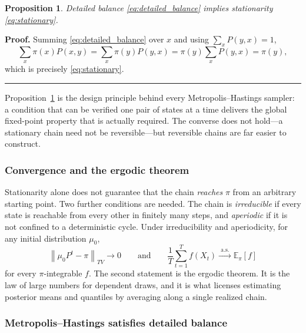 \documentclass[11pt]{article}
\newtheorem{proposition}{Proposition}
\newenvironment{proof}[1][Proof]{\noindent\textbf{#1.} }{\ \rule{0.5em}{0.5em}}
\begin{document}
\begin{proposition}
Detailed balance \eqref{eq:detailed_balance} implies stationarity
\eqref{eq:stationary}.
\label{prop:db_implies_stationarity}
\end{proposition}

\begin{proof}
Summing \eqref{eq:detailed_balance} over $x$ and using $\sum_{x}P(y,x)=1$,
\begin{equation*}
    \sum_{x}\pi(x)P(x,y)
    =\sum_{x}\pi(y)P(y,x)
    =\pi(y)\sum_{x}P(y,x)
    =\pi(y),
\end{equation*}
which is precisely \eqref{eq:stationary}.
\end{proof}

Proposition~\ref{prop:db_implies_stationarity} is the design principle behind
every Metropolis--Hastings sampler: a condition that can be verified one pair of
states at a time delivers the global fixed-point property that is actually
required. The converse does not hold---a stationary chain need not be
reversible---but reversible chains are far easier to construct.

\subsubsection*{Convergence and the ergodic theorem}

Stationarity alone does not guarantee that the chain \emph{reaches} $\pi$ from
an arbitrary starting point. Two further conditions are needed. The chain is
\emph{irreducible} if every state is reachable from every other in finitely many
steps, and \emph{aperiodic} if it is not confined to a deterministic cycle.
Under irreducibility and aperiodicity, for any initial distribution $\mu_0$,
\begin{equation}
    \left\|\mu_0P^{t}-\pi\right\|_{TV}\longrightarrow 0
    \qquad\text{and}\qquad
    \frac{1}{T}\sum_{t=1}^{T}f\left(X_t\right)
    \xrightarrow{\text{ a.s. }}\mathbb{E}_{\pi}\left[f\right]
    \label{eq:ergodic}
\end{equation}
for every $\pi$-integrable $f$. The second statement is the ergodic theorem. It
is the law of large numbers for dependent draws, and it is what licenses
estimating posterior means and quantiles by averaging along a single realized
chain.

\subsubsection*{Metropolis--Hastings satisfies detailed balance}
\end{document}
